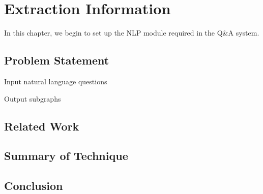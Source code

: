 \chapter{Extraction Information}
\label{Ch-3:Sec:Extraction}

In this chapter, we begin to set up the NLP module required in the Q\&A system.

\section{Problem Statement}



Input natural language questions

Output subgraphs

\section{Related Work}

\section{Summary of Technique}

\section{Conclusion}